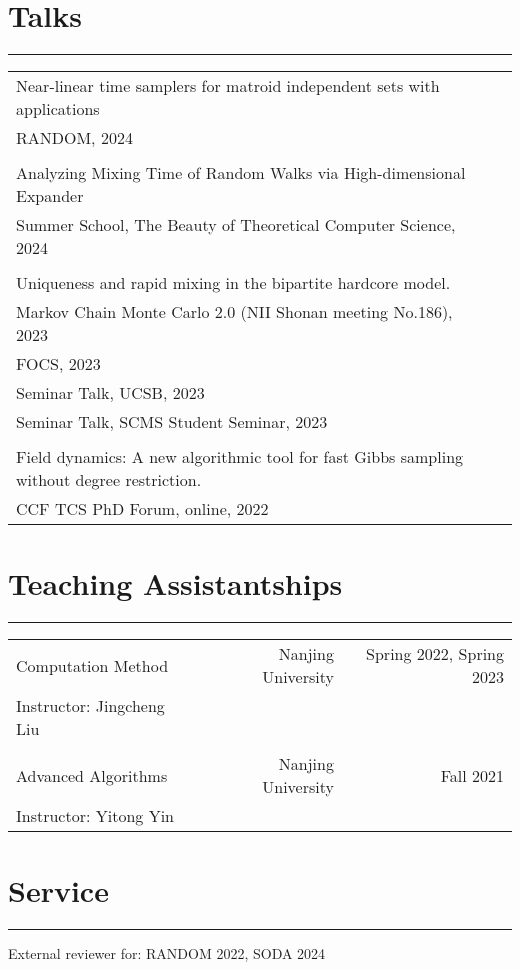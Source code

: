 \documentclass{article}
\begin{document}
\section*{Talks}
\vspace{-1em} \hrule \vspace{1em}

\begin{tabularx}{\textwidth}{@{\hskip 0pt}lX@{\hskip 0pt}}
Near-linear time samplers for matroid independent sets with applications \\
\hspace{20pt} RANDOM, 2024 \\
\\
Analyzing Mixing Time of Random Walks via High-dimensional Expander \\
\hspace{20pt} Summer School, The Beauty of Theoretical Computer Science, 2024\\
\\
Uniqueness and rapid mixing in the bipartite hardcore model. & \\
\hspace{20pt} Markov Chain Monte Carlo 2.0 (NII Shonan meeting No.186), 2023 \\
\hspace{20pt} FOCS, 2023\\
\hspace{20pt} Seminar Talk, UCSB, 2023\\
\hspace{20pt} Seminar Talk, SCMS Student Seminar, 2023\\
\\
Field dynamics: A new algorithmic tool for fast Gibbs sampling without degree restriction. & \\
\hspace{20pt} CCF TCS PhD Forum, online, 2022
\end{tabularx}

\section*{Teaching Assistantships}
\vspace{-1em} \hrule \vspace{1em}

\begin{tabularx}{\textwidth}{@{\hskip 0pt}lXrr@{\hskip 0pt}}
  \large Computation Method & & Nanjing University & Spring 2022, Spring 2023 \\
  Instructor: Jingcheng Liu \\
  \\
  \large Advanced Algorithms & & Nanjing University & Fall 2021 \\ 
  Instructor: Yitong Yin
\end{tabularx}

\section*{Service}
\vspace{-1em} \hrule \vspace{1em}

External reviewer for: RANDOM 2022, SODA 2024
\end{document}
